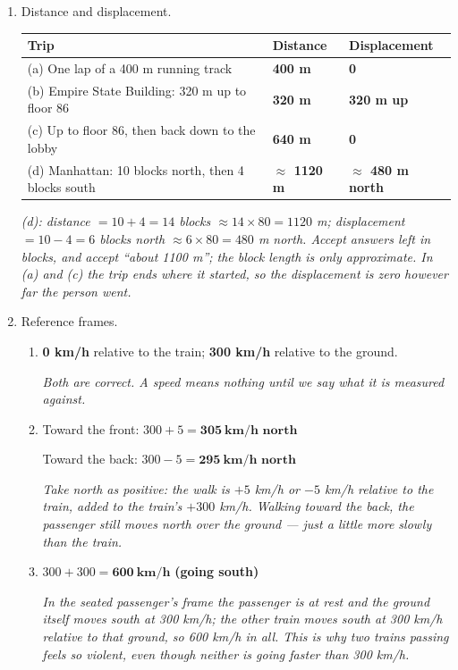 \documentclass[12pt, twoside]{article}
\begin{document}
\begin{enumerate}[itemsep=0.4cm]
\newpage

\item Distance and displacement.

  \vspace{0.15cm}
  {\small
  \renewcommand{\arraystretch}{1.6}
  \begin{tabular}{| l | l | l |}
    \hline
    \textbf{Trip} & \textbf{Distance} & \textbf{Displacement} \\ \hline
    (a) One lap of a 400 m running track & \textbf{400 m} & \textbf{0} \\ \hline
    (b) Empire State Building: 320 m up to floor 86 & \textbf{320 m} &
      \textbf{320 m up} \\ \hline
    (c) Up to floor 86, then back down to the lobby & \textbf{640 m} &
      \textbf{0} \\ \hline
    (d) Manhattan: 10 blocks north, then 4 blocks south & \textbf{$\approx$ 1120 m} &
      \textbf{$\approx$ 480 m north} \\ \hline
  \end{tabular}}

  \vspace{0.2cm}
  \emph{(d): distance $= 10 + 4 = 14$ blocks $\approx 14 \times 80 = 1120$ m;
  displacement $= 10 - 4 = 6$ blocks north $\approx 6 \times 80 = 480$ m north.
  Accept answers left in blocks, and accept ``about 1100 m''; the block length is
  only approximate. In (a) and (c) the trip ends where it started, so the
  displacement is zero however far the person went.}

\item Reference frames.
  \begin{enumerate}[itemsep=0.3cm]
    \item \textbf{0 km/h} relative to the train; \textbf{300 km/h} relative to the
      ground.

      \emph{Both are correct. A speed means nothing until we say what it is
      measured against.}
    \item Toward the front: $300 + 5 = \mathbf{305~\textbf{km/h north}}$

      Toward the back: $300 - 5 = \mathbf{295~\textbf{km/h north}}$

      \emph{Take north as positive: the walk is $+5$ km/h or $-5$ km/h relative to
      the train, added to the train's $+300$ km/h. Walking toward the back, the
      passenger still moves north over the ground --- just a little more slowly than
      the train.}
    \item $300 + 300 = \mathbf{600~\textbf{km/h}}$ \textbf{(going south)}

      \emph{In the seated passenger's frame the passenger is at rest and the ground
      itself moves south at 300 km/h; the other train moves south at 300 km/h
      relative to that ground, so 600 km/h in all. This is why two trains passing
      feels so violent, even though neither is going faster than 300 km/h.}
  \end{enumerate}

\end{enumerate}
\end{document}

